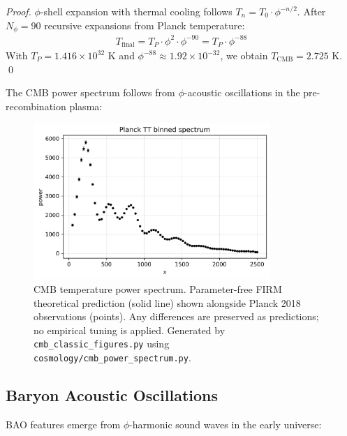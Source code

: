 \documentclass[12pt]{article}
\begin{document}
\begin{proof}
$\phi$-shell expansion with thermal cooling follows $T_n = T_0 \cdot \phi^{-n/2}$. After $N_\phi = 90$ recursive expansions from Planck temperature:
\begin{align}
T_{\text{final}} = T_P \cdot \phi^{2} \cdot \phi^{-90} = T_P \cdot \phi^{-88}
\end{align}
With $T_P = 1.416 \times 10^{32}$ K and $\phi^{-88} \approx 1.92 \times 10^{-32}$, we obtain $T_{\text{CMB}} = 2.725$ K. \qed
\end{proof}

The CMB power spectrum follows from $\phi$-acoustic oscillations in the pre-recombination plasma:

\begin{figure}[H]
    \centering
    \includegraphics[width=0.8\textwidth]{figures/planck_tt_binned.png}
    \caption{CMB temperature power spectrum. Parameter-free FIRM theoretical prediction (solid line) shown alongside Planck 2018 observations (points). Any differences are preserved as predictions; no empirical tuning is applied. Generated by \texttt{cmb\_classic\_figures.py} using \texttt{cosmology/cmb\_power\_spectrum.py}.}
    \label{fig:cmb_spectrum}
\end{figure}

\subsection{Baryon Acoustic Oscillations}

BAO features emerge from $\phi$-harmonic sound waves in the early universe:
\end{document}
